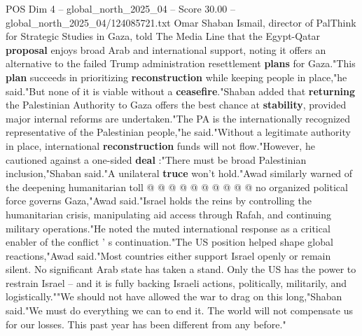 \begin{textsample}{POS Dim 4 – global\_north\_2025\_04 – Score 30.00 – global\_north\_2025\_04/124085721.txt}
Omar Shaban Ismail, director of PalThink for Strategic Studies in Gaza, told The Media Line that the Egypt-Qatar \textbf{proposal} enjoys broad Arab and international support, noting it offers an alternative to the failed Trump administration resettlement \textbf{plans} for Gaza."This \textbf{plan} succeeds in prioritizing \textbf{reconstruction} while keeping people in place,"he said."But none of it is viable without a \textbf{ceasefire}."Shaban added that \textbf{returning} the Palestinian Authority to Gaza offers the best chance at \textbf{stability}, provided major internal reforms are undertaken."The PA is the internationally recognized representative of the Palestinian people,"he said."Without a legitimate authority in place, international \textbf{reconstruction} funds will not flow."However, he cautioned against a one-sided \textbf{deal} :"There must be broad Palestinian inclusion,"Shaban said."A unilateral \textbf{truce} won't hold."Awad similarly warned of the deepening humanitarian toll @ @ @ @ @ @ @ @ @ @ no organized political force governs Gaza,"Awad said."Israel holds the reins by controlling the humanitarian crisis, manipulating aid access through Rafah, and continuing military operations."He noted the muted international response as a critical enabler of the conflict ' s continuation."The US position helped shape global reactions,"Awad said."Most countries either support Israel openly or remain silent.
No significant Arab state has taken a stand.
Only the US has the power to restrain Israel -- and it is fully backing Israeli actions, politically, militarily, and logistically.""We should not have allowed the war to drag on this long,"Shaban said."We must do everything we can to end it.
The world will not compensate us for our losses.
This past year has been different from any before."

\end{textsample}
